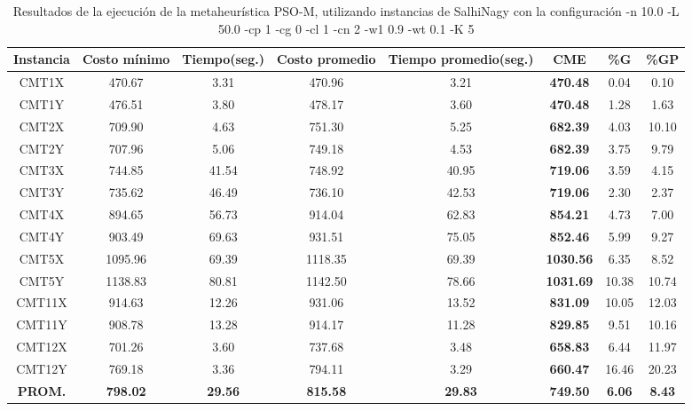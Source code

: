 \begin{table}[h]
\caption{Resultados de la ejecución de la metaheurística PSO-M, utilizando instancias de SalhiNagy con la configuración -n 10.0 -L 50.0 -cp 1 -cg 0 -cl 1 -cn 2 -w1 0.9 -wt 0.1 -K 5}
\centering
\small
\begin{tabular}{c c c c c c c c}
\hline\hline
Instancia & Costo mínimo & Tiempo(seg.) & Costo promedio & Tiempo promedio(seg.) & CME & \%G & \%GP \\ [0.5ex]
\hline
CMT1X & 470.67 & 3.31 & 
470.96 & 3.21 & \bf{470.48} & 
0.04 & 0.10\\CMT1Y & 476.51 & 3.80 & 
478.17 & 3.60 & \bf{470.48} & 
1.28 & 1.63\\CMT2X & 709.90 & 4.63 & 
751.30 & 5.25 & \bf{682.39} & 
4.03 & 10.10\\CMT2Y & 707.96 & 5.06 & 
749.18 & 4.53 & \bf{682.39} & 
3.75 & 9.79\\CMT3X & 744.85 & 41.54 & 
748.92 & 40.95 & \bf{719.06} & 
3.59 & 4.15\\CMT3Y & 735.62 & 46.49 & 
736.10 & 42.53 & \bf{719.06} & 
2.30 & 2.37\\CMT4X & 894.65 & 56.73 & 
914.04 & 62.83 & \bf{854.21} & 
4.73 & 7.00\\CMT4Y & 903.49 & 69.63 & 
931.51 & 75.05 & \bf{852.46} & 
5.99 & 9.27\\CMT5X & 1095.96 & 69.39 & 
1118.35 & 69.39 & \bf{1030.56} & 
6.35 & 8.52\\CMT5Y & 1138.83 & 80.81 & 
1142.50 & 78.66 & \bf{1031.69} & 
10.38 & 10.74\\CMT11X & 914.63 & 12.26 & 
931.06 & 13.52 & \bf{831.09} & 
10.05 & 12.03\\CMT11Y & 908.78 & 13.28 & 
914.17 & 11.28 & \bf{829.85} & 
9.51 & 10.16\\CMT12X & 701.26 & 3.60 & 
737.68 & 3.48 & \bf{658.83} & 
6.44 & 11.97\\CMT12Y & 769.18 & 3.36 & 
794.11 & 3.29 & \bf{660.47} & 
16.46 & 20.23\\\bf{PROM.} & 
\bf{798.02} & \bf{29.56} & \bf{815.58} & \bf{29.83} & \bf{749.50} & \bf{6.06} & \bf{8.43}\\[1ex]\hline
\end{tabular}
\label{table:nonlin}
\end{table}
